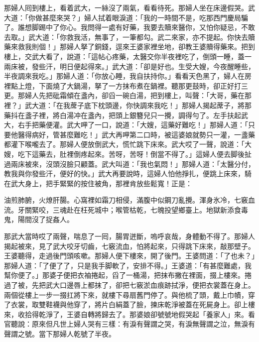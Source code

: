 那婦人囘到樓上，看着武大，一絲沒了兩氣，看看待死。那婦人坐在床邊假哭。武大道：「你做甚麼來哭？」婦人拭着眼淚道：「我的一時間不是，吃那西門慶局騙了。誰想脚踢中了你心。我問得一處有好藥，我要去贖來醫你，又怕你疑忌，不敢去取。」武大道：「你救我活，無事了，一筆都勾。武二來家，亦不提起。你快去贖藥來救我則個！」那婦人拏了銅錢，逕來王婆家裡坐地，卻教王婆贖得藥來。把到樓上，交武大看了，說道：「這帖心疼藥，太醫交你半夜裡吃了，倒頭一睡，蓋一兩床被，發些汗，明日便起得來。」武大道：「卻是好也。生受大嫂，今夜醒睡些，半夜調來我吃。」{}那婦人道：「你放心睡，我自扶持你。」{}看看天色黑了，婦人在房裡點上燈，下面燒了大鍋湯，拏了一方抹布煮在鍋裡。聽那更鼓時，卻正好打三更。那婦人先把砒霜傾在盞內，卻舀一碗白湯，把到樓上，叫聲：「大哥，藥在那裡？」武大道：「在我蓆子底下枕頭邊，你快調來我吃！」{}那婦人揭起蓆子，將那藥抖在盞子裡，將白湯冲在盞內，把頭上銀簪兒只一攪，調得勻了。左手扶起武大，右手把藥便灌。武大呷了一口，說道：「大嫂，這藥好難吃！」那婦人道：「只要他醫得病好，{}管甚麼難吃！」武大再呷第二口時，被這婆娘就勢只一灌，一盞藥都灌下喉嚨去了。那婦人便放倒武大，慌忙跳下床來。武大哎了一聲，說道：「大嫂，吃下這藥去，肚裡倒疼起來。苦呀，苦呀！倒當不得了。」這婦人便去脚後扯過兩床被來，沒頭沒臉只顧蓋。武大叫道：「我也氣悶！」那婦人道：「太醫分付，教我與你發些汗，便好的快。」武大再要說時，這婦人怕他掙扎，便跳上床來，騎在武大身上，把手緊緊的按住被角，那裡肯放些鬆寬！正是：

\begin{myquote} 
油煎肺腑，火燎肝腸。心窩裡如霜刀相侵，滿腹中似鋼刀亂攪。渾身氷冷，七竅血流。牙關緊咬，三魂赴在枉死城中；喉管枯乾，七魄投望鄉臺上。地獄新添食毒鬼，陽間沒了捉姦人。
\end{myquote} 

那武大當時哎了兩聲，喘息了一囘，腸胃迸斷，嗚呼哀哉，身體動不得了。那婦人揭起被來，見了武大咬牙切齒，七竅流血，怕將起來，只得跳下床來，敲那壁子。王婆聽得，走過後門頭咳嗽。那婦人便下樓來，開了後門。王婆問道：「了也未？」那婦人道：「了便了了，只是我手脚軟了，安排不得。」王婆道：「有甚麼難處，我幫你便了。」那婆子便把衣袖捲起，舀了一桶湯，把抹布撇在裡面，掇上樓來。捲過了被，先把武大口邊唇上都抹了，卻把七竅淤血痕跡拭淨，便把衣裳蓋在身上。兩個從樓上一步一掇扛將下來，就樓下尋扇舊門停了。與他梳了頭，戴上巾幘，穿了衣裳，取雙鞋襪與他穿了，將片白絹蓋了臉，揀床乾淨被蓋在死屍身上。卻上樓來，收拾得乾淨了，王婆自轉將歸去了。那婆娘卻號號地假哭起「養家人」來。看官聽說：原來但凡世上婦人哭有三樣：有淚有聲謂之哭，有淚無聲謂之泣，無淚有聲謂之號。當下那婦人乾號了半夜。

